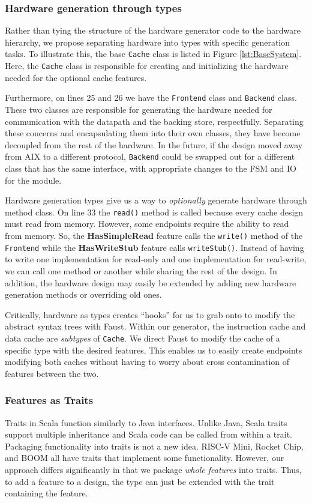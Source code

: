 \documentclass[conference]{IEEEtran}
\begin{document}
\subsubsection{Hardware generation through types}\label{sec:types}
Rather than tying the structure of the hardware generator code to the hardware hierarchy, we propose separating hardware into types with specific generation tasks. To illustrate this, the base \texttt{Cache} class is listed in Figure \ref{lst:BaseSystem}. Here, the \texttt{Cache} class is responsible for creating and initializing the hardware needed for the optional cache features. 

Furthermore, on lines 25 and 26 we have the \texttt{Frontend} class and \texttt{Backend} class. These two classes are responsible for generating the hardware needed for communication with the datapath and the backing store, respectfully. Separating these concerns and encapsulating them into their own classes, they have become decoupled from the rest of the hardware. In the future, if the design moved away from AIX to a different protocol, \texttt{Backend} could be swapped out for a different class that has the same interface, with appropriate changes to the FSM and IO for the module.

Hardware generation types give us a way to \emph{optionally} generate hardware through method class. On line 33 the \texttt{read()} method is called because every cache design must read from memory. However, some endpoints require the ability to read from memory. So, the \textbf{HasSimpleRead} feature calls the \texttt{write()} method of the \texttt{Frontend} while the \textbf{HasWriteStub} feature calls \texttt{writeStub()}. Instead of having to write one implementation for read-only and one implementation for read-write, we can call one method or another while sharing the rest of the design. In addition, the hardware design may easily be extended by adding new hardware generation methods or overriding old ones.

Critically, hardware as types creates ``hooks'' for us to grab onto to modify the abstract syntax trees with Faust. Within our generator, the instruction cache and data cache are \emph{subtypes} of \texttt{Cache}. We direct Faust to modify the cache of a specific type with the desired features. This enables us to easily create endpoints modifying both caches without having to worry about cross contamination of features between the two.

\subsubsection{Features as Traits}
Traits in Scala function similarly to Java interfaces. Unlike Java, Scala traits support multiple inheritance and Scala code can be called from within a trait. Packaging functionality into traits is not a new idea. RISC-V Mini, Rocket Chip, and BOOM all have traits that implement some functionality. However, our approach differs significantly in that we package \emph{whole features} into traits. Thus, to add a feature to a design, the type can just be extended with the trait containing the feature.
\end{document}
